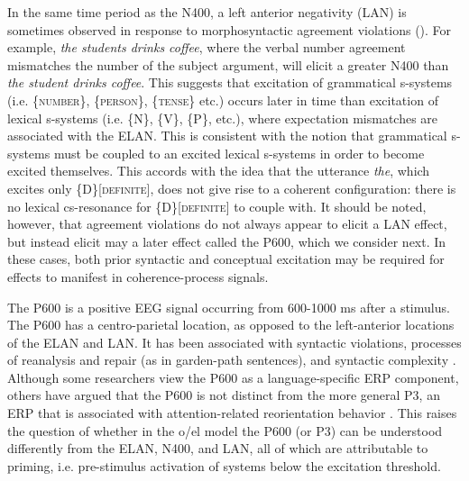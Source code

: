   In the same time period as the N400, a left anterior negativity (LAN) is sometimes observed in response to morphosyntactic agreement violations (\citealt{Friederici2002,GunterEtAl2000,KutasFedermeier2011,OsterhoutHolcomb1992}). For example, \textit{the students drinks coffee}, where the verbal number agreement mismatches the number of the subject argument, will elicit a greater N400 than \textit{the student drinks coffee}. This suggests that excitation of grammatical s-systems (i.e. \{\textsc{number}\}, \{\textsc{person}\}, \{\textsc{tense}\} etc.) occurs later in time than excitation of lexical s-systems (i.e. \{N\}, \{V\}, \{P\}, etc.), where expectation mismatches are associated with the ELAN. This is consistent with the notion that grammatical s-systems must be coupled to an excited lexical s-systems in order to become excited themselves. This accords with the idea that the utterance \textit{the}, which excites only \{D\}[\textsc{definite}], does not give rise to a coherent configuration: there is no lexical cs-resonance for \{D\}[\textsc{definite}] to couple with. It should be noted, however, that agreement violations do not always appear to elicit a LAN effect, but instead elicit may a later effect called the P600, which we consider next. In these cases, both prior syntactic and conceptual excitation may be required for effects to manifest in coherence-process signals.

  The P600 is a positive EEG signal occurring from 600-1000 ms after a stimulus. The P600 has a centro-parietal location, as opposed to the left-anterior locations of the ELAN and LAN. It has been associated with syntactic violations, processes of reanalysis and repair (as in garden-path sentences), and syntactic complexity \citep{Friederici2002}. Although some researchers view the P600 as a language-specific ERP component, others have argued that the P600 is not distinct from the more general P3, an ERP that is associated with attention-related reorientation behavior \citep{SassenhagenBornkessel-Schlesewsky2015}. This raises the question of whether in the o/el model the P600 (or P3) can be understood differently from the ELAN, N400, and LAN, all of which are attributable to priming, i.e. pre-stimulus activation of systems below the excitation threshold.


